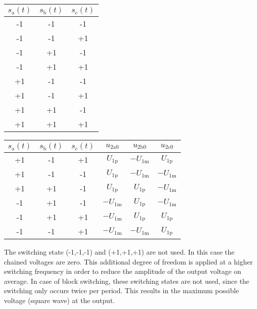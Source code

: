 \begin{solutionblock}
    \begin{minipage}{0.3\textwidth}
            \begin{tabular}{|c|c|c|} %
            \hline
            \bfseries $s_\mathrm{a}(t)$ & \bfseries $s_\mathrm{b}(t)$ & \bfseries $s_\mathrm{c}(t)$ \\ \hline
            -1 & -1 & -1 \\ \hline
            -1 & -1 & +1 \\ \hline
            -1 & +1 & -1 \\ \hline
            -1 & +1 & +1 \\ \hline
            +1 & -1 & -1 \\ \hline
            +1 & -1 & +1 \\ \hline
            +1 & +1 & -1 \\ \hline
            +1 & +1 & +1 \\ \hline
        \end{tabular}
        \noindent
        \label{stable:ex07_Task2_Switchingstates}    
    \end{minipage}
    \hfill
    \begin{minipage}{0.55\textwidth} 
        \begin{tabular}{|c|c|c|c|c|c|} %
            \hline
            \bfseries $s_\mathrm{a}(t)$ & \bfseries $s_\mathrm{b}(t)$ & \bfseries $s_\mathrm{c}(t)$
            & \bfseries $u_\mathrm{2a0}$ & \bfseries $u_\mathrm{2b0}$ & \bfseries $u_\mathrm{2c0}$ \\ \hline
            +1 & -1 & +1 & $U_\mathrm{1p}$ & $-U_\mathrm{1m}$ & $U_\mathrm{1p}$ \\ \hline
            +1 & -1 & -1 & $U_\mathrm{1p}$ & $-U_\mathrm{1m}$ & $-U_\mathrm{1m}$ \\ \hline
            +1 & +1 & -1 & $U_\mathrm{1p}$ & $U_\mathrm{1p}$ & $-U_\mathrm{1m}$ \\ \hline
            -1 & +1 & -1 & $-U_\mathrm{1m}$ & $U_\mathrm{1p}$ & $-U_\mathrm{1m}$ \\ \hline
            -1 & +1 & +1 & $-U_\mathrm{1m}$ & $U_\mathrm{1p}$ & $U_\mathrm{1p}$ \\ \hline
            -1 & -1 & +1 & $-U_\mathrm{1m}$ & $-U_\mathrm{1m}$ & $U_\mathrm{1p}$ \\ \hline
        \end{tabular}
        \label{stable:ex07_Task2_UsedSwitchingStates}    
    \end{minipage}
    \bigskip
    \FloatBarrier
    The switching state (-1,-1,-1) and (+1,+1,+1) are not used. In this case the chained voltages are zero. 
    This additional degree of freedom is applied at a higher switching frequency in order to reduce the amplitude of the
    output voltage on average. In case of block switching, these switching states are not used, since
    the switching only occurs twice per period. This results in the maximum possible voltage (square wave) at the output.
\end{solutionblock}

